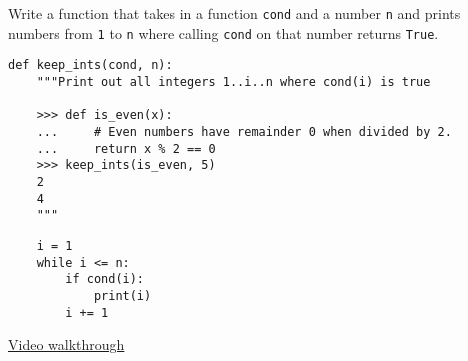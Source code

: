 \begin{blocksection}
\question Write a function that takes in a function \lstinline$cond$ and a
number \lstinline$n$ and prints numbers from \lstinline$1$ to
\lstinline$n$ where calling \lstinline$cond$ on that number returns
\lstinline$True$.

\begin{lstlisting}
def keep_ints(cond, n):
    """Print out all integers 1..i..n where cond(i) is true

    >>> def is_even(x):
    ...     # Even numbers have remainder 0 when divided by 2.
    ...     return x % 2 == 0
    >>> keep_ints(is_even, 5)
    2
    4
    """
\end{lstlisting}

\begin{solution}[1in]
\begin{lstlisting}
    i = 1
    while i <= n:
        if cond(i):
            print(i)
        i += 1
\end{lstlisting}
\href{https://www.youtube.com/watch?v=Fiw0f5yuQgo&vq=hd1080&t=72m24s}{Video walkthrough}
\end{solution}
\end{blocksection}
